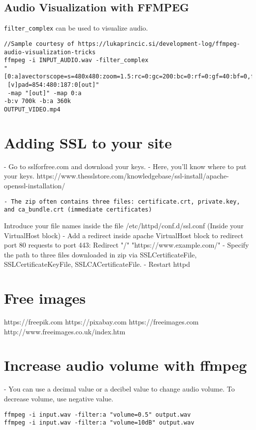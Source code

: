 \documentclass{article}
\begin{document}
\subsection{Audio Visualization with FFMPEG}
\lstinline{filter_complex} can be used to visualize audio.

\begin{lstlisting}
//Sample courtesy of https://lukaprincic.si/development-log/ffmpeg-audio-visualization-tricks
ffmpeg -i INPUT_AUDIO.wav -filter_complex 
"[0:a]avectorscope=s=480x480:zoom=1.5:rc=0:gc=200:bc=0:rf=0:gf=40:bf=0,format=yuv420p[v];
 [v]pad=854:480:187:0[out]" 
 -map "[out]" -map 0:a 
-b:v 700k -b:a 360k 
OUTPUT_VIDEO.mp4		
\end{lstlisting}

\section{Adding SSL to your site}
- Go to sslforfree.com and download your keys.
- Here, you'll know where to put your keys.   https://www.thesslstore.com/knowledgebase/ssl-install/apache-openssl-installation/
\begin{verbatim}
- The zip often contains three files: certificate.crt, private.key, and ca_bundle.crt (immediate certificates)
\end{verbatim}


Introduce your file names inside the file /etc/httpd/conf.d/ssl.conf (Inside your VirtualHost block)
- Add a redirect inside apache VirtualHost block to redirect port 80 requests to port 443:
        Redirect "/" "https://www.example.com/"
- Specify the path to three files downloaded in zip via SSLCertificateFile, SSLCertificateKeyFile, SSLCACertificateFile.
- Restart httpd

\section{Free images}

https://freepik.com
https://pixabay.com
https://freeimages.com
http://www.freeimages.co.uk/index.htm

\section{Increase audio volume with ffmpeg}
- You can use a decimal value or a decibel value to change audio volume. To decrease volume, use negative value.
\begin{verbatim}
ffmpeg -i input.wav -filter:a "volume=0.5" output.wav
ffmpeg -i input.wav -filter:a "volume=10dB" output.wav
\end{verbatim}
\end{document}
